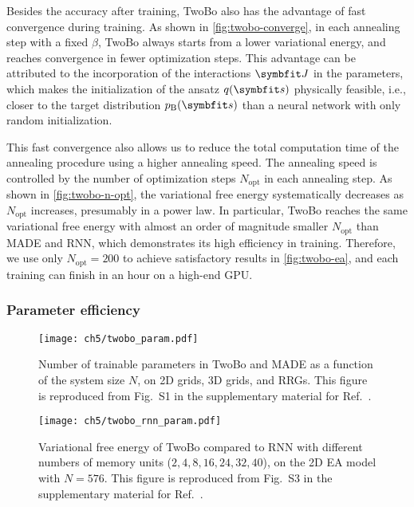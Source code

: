 Besides the accuracy after training, TwoBo also has the advantage of fast convergence during training. As shown in \cref{fig:twobo-converge}, in each annealing step with a fixed $\beta$, TwoBo always starts from a lower variational energy, and reaches convergence in fewer optimization steps. This advantage can be attributed to the incorporation of the interactions $\mJ$ in the parameters, which makes the initialization of the ansatz $q(\vs)$ physically feasible, i.e., closer to the target distribution $p_\text{B}(\vs)$ than a neural network with only random initialization.

This fast convergence also allows us to reduce the total computation time of the annealing procedure using a higher annealing speed. The annealing speed is controlled by the number of optimization steps $N_\text{opt}$ in each annealing step. As shown in \cref{fig:twobo-n-opt}, the variational free energy systematically decreases as $N_\text{opt}$ increases, presumably in a power law. In particular, TwoBo reaches the same variational free energy with almost an order of magnitude smaller $N_\text{opt}$ than MADE and RNN, which demonstrates its high efficiency in training. Therefore, we use only $N_\text{opt} = 200$ to achieve satisfactory results in \cref{fig:twobo-ea}, and each training can finish in an hour on a high-end GPU.

\subsubsection{Parameter efficiency}

\begin{figure}[htb]
\centering
\texttt{[image: ch5/twobo\_param.pdf]}
\caption[Number of parameters vs.\ system size for TwoBo and MADE]{
Number of trainable parameters in TwoBo and MADE as a function of the system size $N$, on 2D grids, 3D grids, and RRGs.
This figure is reproduced from Fig.~S1 in the supplementary material for Ref.~\cite{biazzo2024sparse}.
}
\label{fig:twobo-param}
\end{figure}

\begin{figure}[htb]
\centering
\texttt{[image: ch5/twobo\_rnn\_param.pdf]}
\caption[Variational free energy vs.\ number of parameters for TwoBo and RNN]{
Variational free energy of TwoBo compared to RNN with different numbers of memory units ($2, 4, 8, 16, 24, 32, 40$), on the 2D EA model with $N = 576$.
This figure is reproduced from Fig.~S3 in the supplementary material for Ref.~\cite{biazzo2024sparse}.
}
\label{fig:twobo-rnn-param}
\end{figure}


